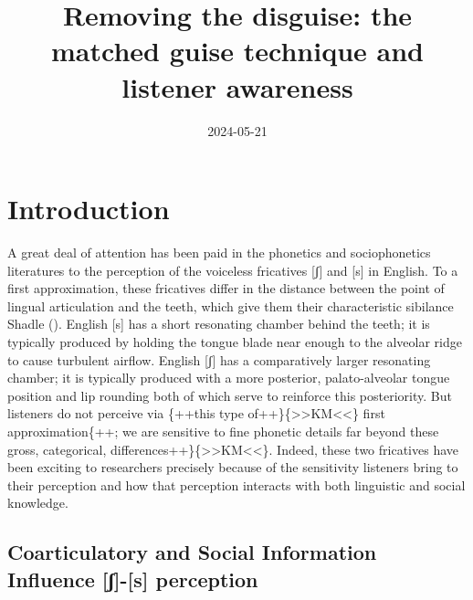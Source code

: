 \documentclass[
  man,
  longtable,
  nolmodern,
  notxfonts,
  notimes,
  colorlinks=true,linkcolor=blue,citecolor=blue,urlcolor=blue]{apa7}
\title{Removing the disguise: the matched guise technique and listener
awareness}
\date{2024-05-21}
\begin{document}
\maketitle


\setcounter{secnumdepth}{-\maxdimen} %

\setlength\LTleft{0pt}


\section{Introduction}\label{introduction}

A great deal of attention has been paid in the phonetics and
sociophonetics literatures to the perception of the voiceless fricatives
{[}ʃ{]} and {[}s{]} in English. To a first approximation, these
fricatives differ in the distance between the point of lingual
articulation and the teeth, which give them their characteristic
sibilance Shadle (). English {[}s{]} has
a short resonating chamber behind the teeth; it is typically produced by
holding the tongue blade near enough to the alveolar ridge to cause
turbulent airflow. English {[}ʃ{]} has a comparatively larger resonating
chamber; it is typically produced with a more posterior, palato-alveolar
tongue position and lip rounding both of which serve to reinforce this
posteriority. But listeners do not perceive via \{++this type
of++\}\{\textgreater\textgreater KM\textless\textless\} first
approximation\{++; we are sensitive to fine phonetic details far beyond
these gross, categorical,
differences++\}\{\textgreater\textgreater KM\textless\textless\}.
Indeed, these two fricatives have been exciting to researchers precisely
because of the sensitivity listeners bring to their perception and how
that perception interacts with both linguistic and social knowledge.

\subsection{Coarticulatory and Social Information Influence
{[}ʃ{]}-{[}s{]}
perception}\label{coarticulatory-and-social-information-influence-ux283-s-perception}
\end{document}
